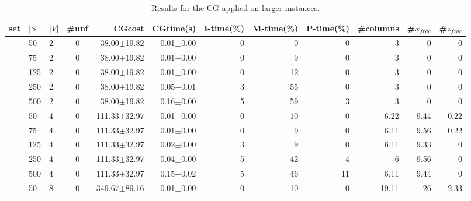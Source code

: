 \documentclass[conference]{IEEEtran}
\begin{document}
\begin{table*}[h]
\begin{center}
  \caption{Results for the CG applied on larger instances. \label{tab:full}}
  \begin{tabular}{c l l c r r r r r r r r}
set & $|S|$ & $|V$| & \#unf  & CGcost  &  CGtime(s)  &  I-time(\%)  &  M-time(\%) & P-time(\%)  &  \#columns  &  \#$x_{frac}$  &  \#$z_{frac}$ \\
\hline
 &50      &  2   &    0  &  38.00$\pm$19.82     &        0.01$\pm$0.00  &  0  &          0   &            0   &         3       &       0       &  0       \\
 &75      &  2   &    0  &  38.00$\pm$19.82     &        0.01$\pm$0.00  &  0  &          9   &            0   &         3       &       0       &  0       \\
 &125     &  2   &    0  &  38.00$\pm$19.82     &        0.01$\pm$0.00  &  0  &          12  &            0   &         3       &       0       &  0       \\
 &250     &  2   &    0  &  38.00$\pm$19.82     &        0.05$\pm$0.01  &  3  &          55  &            0   &         3       &       0       &  0       \\
 &500     &  2   &    0  &  38.00$\pm$19.82     &        0.16$\pm$0.00  &  5  &          59  &            3   &         3       &       0       &  0       \\
 &50      &  4   &    0  &  111.33$\pm$32.97    &        0.01$\pm$0.00  &  0  &          10  &            0   &         6.22    &       9.44    &  0.22    \\
 &75      &  4   &    0  &  111.33$\pm$32.97    &        0.01$\pm$0.00  &  0  &          9   &            0   &         6.11    &       9.56    &  0.22    \\
 &125     &  4   &    0  &  111.33$\pm$32.97    &        0.02$\pm$0.00  &  3  &          9   &            0   &         6.11    &       9.33    &  0       \\
 &250     &  4   &    0  &  111.33$\pm$32.97    &        0.04$\pm$0.00  &  5  &          42  &            4   &         6       &       9.56    &  0       \\
 &500     &  4   &    0  &  111.33$\pm$32.97    &        0.15$\pm$0.02  &  5  &          46  &            11  &         6.11    &       9.44    &  0       \\
 &50      &  8   &    0  &  349.67$\pm$89.16    &        0.01$\pm$0.00  &  0  &          10  &            0   &         19.11   &       26      &  2.33    \\

\end{tabular}
\end{center}
\end{table*}
\end{document}
